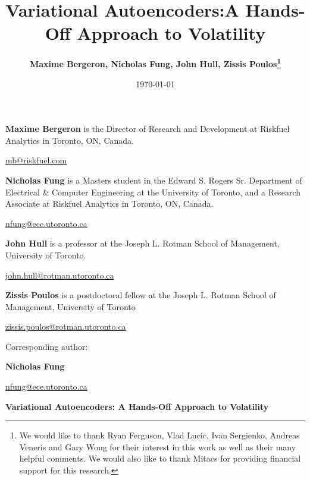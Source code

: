 \documentclass[12pt]{article}
\title{Variational Autoencoders:\linebreak  A Hands-Off Approach to Volatility}
\author{
\normalsize \textbf{Maxime Bergeron, Nicholas Fung, John Hull, Zissis Poulos\thanks {We would like to thank Ryan Ferguson, Vlad Lucic, Ivan Sergienko, Andreas Veneris and  Gary Wong  for their interest in this work as well as their many helpful comments. We would also like to thank Mitacs for providing financial support for this research.}}
}
\date{\today}
\begin{document}
{}

\maketitle

{\parskip=0pt


  \noindent\textbf{Maxime Bergeron} is the Director of Research and Development at Riskfuel Analytics in Toronto, ON, Canada.

  \noindent\underline{mb@riskfuel.com}

  \vspace{0.5cm}
  \noindent\textbf{Nicholas Fung} is a Masters student in the Edward S. Rogers Sr. Department of Electrical \& Computer Engineering at the University of Toronto, and a Research Associate at Riskfuel Analytics in Toronto, ON, Canada.

  \noindent\underline{nfung@ece.utoronto.ca}
  \vspace{0.5cm}
 
    \noindent\textbf{John Hull} is a professor at the Joseph L. Rotman School of Management, University of Toronto.
    
    \noindent\underline{john.hull@rotman.utoronto.ca}
    
  
  \vspace{0.5cm}
  \noindent\textbf{Zissis Poulos} is a postdoctoral fellow at the Joseph L. Rotman School of Management, University of Toronto

\noindent\underline{zissis.poulos@rotman.utoronto.ca}


\vspace{0.7cm}  
  \noindent Corresponding author:

\noindent\textbf{Nicholas Fung}

\noindent\underline{nfung@ece.utoronto.ca}
}

\newpage

\centerline{\bf\large Variational Autoencoders: A Hands-Off Approach to Volatility}
\end{document}
